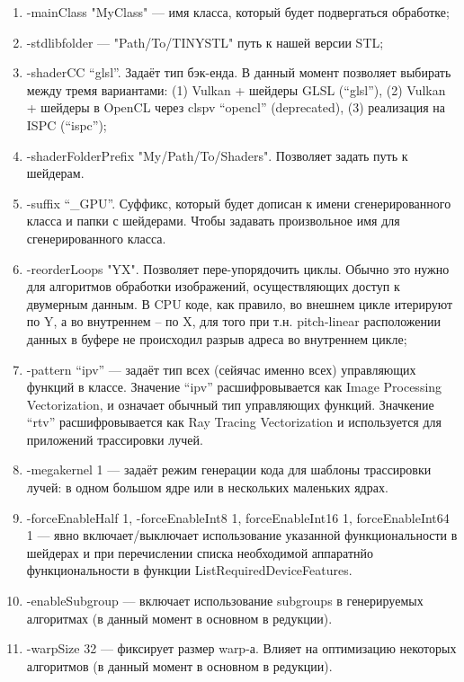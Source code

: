 \documentclass[11pt,fleqn,english,russian]{report} %
\begin{document}
\begin{enumerate}
\item -mainClass "MyClass" --- имя класса, который будет подвергаться обработке;
\item -stdlibfolder --- "Path/To/TINYSTL" путь к нашей версии STL;

\item -shaderCC ``glsl''. Задаёт тип бэк-енда. В данный момент позволяет выбирать между тремя вариантами: (1) Vulkan + шейдеры GLSL (``glsl''), (2) Vulkan + шейдеры в OpenCL через clspv ``opencl'' (deprecated), (3) реализация на ISPC (``ispc''); 

\item -shaderFolderPrefix "My/Path/To/Shaders". Позволяет задать путь к шейдерам. 

\item -suffix ``\_GPU''. Суффикс, который будет дописан к имени сгенерированного класса и папки с шейдерами. Чтобы задавать произвольное имя для сгенерированного класса.

\item -reorderLoops "YX". Позволяет пере-упорядочить циклы. Обычно это нужно для алгоритмов обработки изображений, осуществляющих доступ к двумерным данным. В CPU коде, как правило, во внешнем цикле итерируют по Y, а во внутреннем -- по X, для того при т.н. pitch-linear расположении данных в буфере не происходил  разрыв адреса во внутреннем цикле;

\item -pattern ``ipv'' --- задаёт тип всех (сейячас именно всех) управляющих функций в классе. Значение ``ipv'' расшифровывается как Image Processing Vectorization, и означает обычный тип управляющих функций. Значкение ``rtv'' расшифровывается как Ray Tracing Vectorization и используется для приложений трассировки лучей.

\item -megakernel 1 --- задаёт режим генерации кода для шаблоны трассировки лучей: в одном большом ядре или в нескольких маленьких ядрах.

\item -forceEnableHalf 1, -forceEnableInt8 1, forceEnableInt16 1, forceEnableInt64 1 --- явно включает/выключает использование указанной функциональности в шейдерах и при перечислении списка необходимой аппаратнйо функциональности в функции ListRequiredDeviceFeatures.

\item -enableSubgroup --- включает использование subgroups в генерируемых алгоритмах (в данный момент в основном в редукции).

\item -warpSize 32 --- фиксирует размер warp-а. Влияет на оптимизацию некоторых алгоритмов (в данный момент в основном в редукции).

\end{enumerate}
\end{document}
